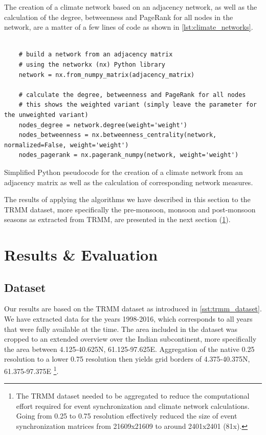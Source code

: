 The creation of a climate network based on an adjacency network, as well as the calculation of the degree, betweenness and PageRank for all nodes in the network, are a matter of a few lines of code as shown in \cref{lst:climate_networks}.

\begin{listing}[H]
  \begin{verbatim}

    # build a network from an adjacency matrix
    # using the networkx (nx) Python library
    network = nx.from_numpy_matrix(adjacency_matrix)

    # calculate the degree, betweenness and PageRank for all nodes
    # this shows the weighted variant (simply leave the parameter for the unweighted variant)
    nodes_degree = network.degree(weight='weight')
    nodes_betweenness = nx.betweenness_centrality(network, normalized=False, weight='weight')
    nodes_pagerank = nx.pagerank_numpy(network, weight='weight')

  \end{verbatim}
  \caption{Simplified Python pseudocode for the creation of a climate network from an adjacency matrix as well as the calculation of corresponding network measures.}
  \label{lst:climate_networks}
\end{listing}

The results of applying the algorithms we have described in this section to the TRMM dataset, more specifically the pre-monsoon, monsoon and post-monsoon seasons as extracted from TRMM, are presented in the next section (\cref{st:event_sync_results}).

\section{Results \& Evaluation}
\label{st:event_sync_results}


\subsection{Dataset}
Our results are based on the TRMM dataset as introduced in \cref{sst:trmm_dataset}. We have extracted data for the years 1998-2016, which corresponds to all years that were fully available at the time. The area included in the dataset was cropped to an extended overview over the Indian subcontinent, more specifically the area between 4.125-40.625N, 61.125-97.625E. Aggregation of the native {0.25\degree} resolution to a lower {0.75\degree} resolution then yields grid borders of 4.375-40.375N, 61.375-97.375E \footnote{The TRMM dataset needed to be aggregated to reduce the computational effort required for event synchronization and climate network calculations. Going from {0.25\degree} to {0.75\degree} resolution effectively reduced the size of event synchronization matrices from 21609x21609 to around 2401x2401 (81x).}.

